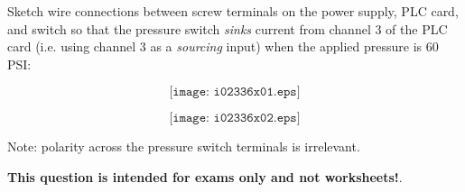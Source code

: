

Sketch wire connections between screw terminals on the power supply, PLC card, and switch so that the pressure switch {\it sinks} current from channel 3 of the PLC card (i.e. using channel 3 as a {\it sourcing} input) when the applied pressure is 60 PSI:

$$\texttt{[image: i02336x01.eps]}$$







$$\texttt{[image: i02336x02.eps]}$$

Note: polarity across the pressure switch terminals is irrelevant.







{\bf This question is intended for exams only and not worksheets!}.


